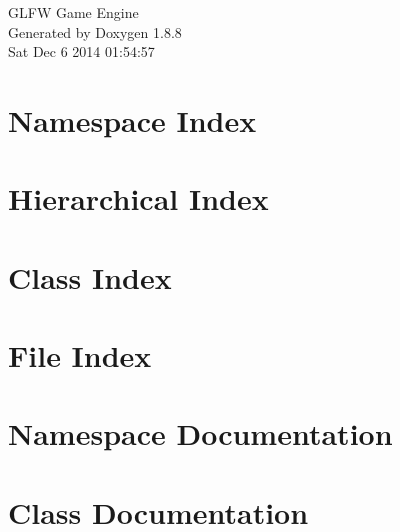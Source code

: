 \documentclass[twoside]{book}
\newcommand{\+}{\discretionary{\mbox{\scriptsize$\hookleftarrow$}}{}{}}
\newcommand{\clearemptydoublepage}{%
  \newpage{\pagestyle{empty}\cleardoublepage}%
}
\begin{document}
\hypersetup{pageanchor=false,
             bookmarks=true,
             bookmarksnumbered=true,
             pdfencoding=unicode
            }
\begin{titlepage}
\vspace*{7cm}
\begin{center}%
{\Large G\+L\+F\+W Game Engine }\\
\vspace*{1cm}
{\large Generated by Doxygen 1.8.8}\\
\vspace*{0.5cm}
{\small Sat Dec 6 2014 01:54:57}\\
\end{center}
\end{titlepage}
\clearemptydoublepage
\tableofcontents
\clearemptydoublepage
{}
\hypersetup{pageanchor=true}

\chapter{Namespace Index}

\chapter{Hierarchical Index}

\chapter{Class Index}

\chapter{File Index}

\chapter{Namespace Documentation}


\chapter{Class Documentation}

















\end{document}
